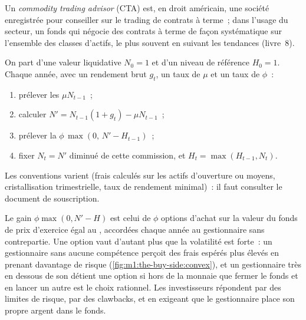 \begin{definition}\label{def:m1:the-buy-side:cta}
Un \emph{commodity trading advisor} (CTA) est,
en droit américain, une société enregistrée pour conseiller sur le trading de contrats à terme~; dans l'usage du secteur,
un fonds qui négocie des contrats à terme de façon systématique sur l'ensemble des classes d'actifs, le plus souvent
en suivant les tendances (livre~8).
\end{definition}

\begin{method}\label{met:m1:the-buy-side:hwm}
On part d'une valeur liquidative $N_0 = 1$ et d'un niveau de référence $H_0 = 1$. Chaque année, avec
un rendement brut $g_t$, un taux de  $\mu$ et un taux de  $\phi$~:
\begin{enumerate}
\item prélever les  $\mu N_{t-1}$~;
\item calculer $N' = N_{t-1}(1+g_t) - \mu N_{t-1}$~;
\item prélever la  $\phi\,\max(0,\, N' - H_{t-1})$~;
\item fixer $N_t = N'$ diminué de cette commission, et $H_t = \max(H_{t-1}, N_t)$.
\end{enumerate}
Les conventions varient (frais calculés sur les actifs d'ouverture ou moyens,
cristallisation trimestrielle, taux de rendement minimal)~: il faut consulter le document de souscription.
\end{method}

\begin{remark}\label{rem:m1:the-buy-side:option}
Le gain $\phi\max(0, N'-H)$ est celui de $\phi$ options d'achat sur la valeur du fonds
de prix d'exercice égal au , accordées chaque année au gestionnaire
sans contrepartie. Une option vaut d'autant plus que la volatilité est forte~: un gestionnaire sans
aucune compétence perçoit des frais espérés plus élevés en prenant davantage de risque
(\cref{fig:m1:the-buy-side:convex}), et un gestionnaire très en dessous de son  détient
une option si hors de la monnaie que fermer le fonds et en lancer un autre est le choix rationnel.
Les investisseurs répondent par des limites de risque, par des clawbacks,
et en exigeant que le gestionnaire place son propre argent dans le fonds.
\end{remark}

